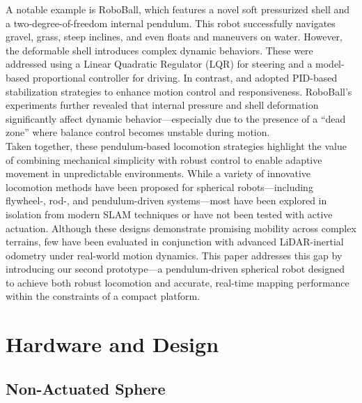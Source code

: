 \documentclass[conference]{IEEEtran}
\begin{document}
\hspace*{1em}A notable example is RoboBall\cite{roboball}, which features a novel soft pressurized shell and a two-degree-of-freedom internal pendulum. This robot successfully navigates gravel, grass, steep inclines, and even floats and maneuvers on water. However, the deformable shell introduces complex dynamic behaviors. These were addressed using a Linear Quadratic Regulator (LQR) for steering and a model-based proportional controller for driving. In contrast, \cite{novelsphere} and \cite{pendulum_sphere} adopted PID-based stabilization strategies to enhance motion control and responsiveness. RoboBall’s experiments further revealed that internal pressure and shell deformation significantly affect dynamic behavior—especially due to the presence of a “dead zone” where balance control becomes unstable during motion.\\
\hspace*{1em}Taken together, these pendulum-based locomotion strategies highlight the value of combining mechanical simplicity with robust control to enable adaptive movement in unpredictable environments. While a variety of innovative locomotion methods have been proposed for spherical robots—including flywheel-, rod-, and pendulum-driven systems—most have been explored in isolation from modern SLAM techniques or have not been tested with active actuation. Although these designs demonstrate promising mobility across complex terrains, few have been evaluated in conjunction with advanced LiDAR-inertial odometry under real-world motion dynamics. This paper addresses this gap by introducing our second prototype—a pendulum-driven spherical robot designed to achieve both robust locomotion and accurate, real-time mapping performance within the constraints of a compact platform.

\section{Hardware and Design}

\subsection{Non-Actuated Sphere}
\end{document}

